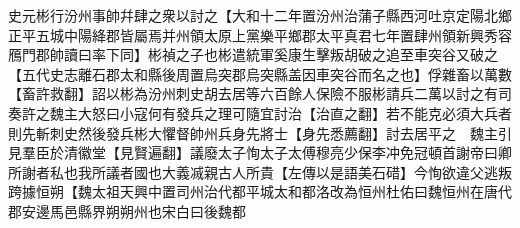 史元彬行汾州事帥幷肆之衆以討之【大和十二年置汾州治蒲子縣西河吐京定陽北鄉正平五城中陽絳郡皆屬焉并州領太原上黨樂平鄉郡太平真君七年置肆州領新興秀容鴈門郡帥讀曰率下同】彬禎之子也彬遣統軍奚康生擊叛胡破之追至車突谷又破之【五代史志離石郡太和縣後周置烏突郡烏突縣盖因車突谷而名之也】俘雜畜以萬數【畜許救翻】詔以彬為汾州刺史胡去居等六百餘人保險不服彬請兵二萬以討之有司奏許之魏主大怒曰小寇何有發兵之理可隨宜討治【治直之翻】若不能克必須大兵者則先斬刺史然後發兵彬大懼督帥州兵身先將士【身先悉薦翻】討去居平之　魏主引見羣臣於清徽堂【見賢遍翻】議廢太子恂太子太傅穆亮少保李冲免冠頓首謝帝曰卿所謝者私也我所議者國也大義㓕親古人所貴【左傳以是語美石碏】今恂欲違父逃叛跨據恒朔【魏太祖天興中置司州治代都平城太和都洛改為恒州杜佑曰魏恒州在唐代郡安邊馬邑縣界朔朔州也宋白曰後魏都